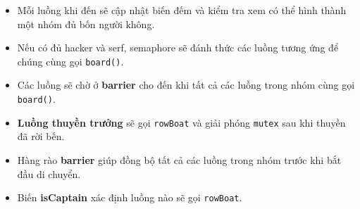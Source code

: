 \begin{itemize}
  \item Mỗi luồng khi đến sẽ cập nhật biến đếm và kiểm tra xem có thể hình thành một nhóm đủ bốn người không.
  \item Nếu có đủ hacker và serf, semaphore sẽ đánh thức các luồng tương ứng để chúng cùng gọi \texttt{board()}.
  \item Các luồng sẽ chờ ở \textbf{barrier} cho đến khi tất cả các luồng trong nhóm cùng gọi \texttt{board()}.
  \item \textbf{Luồng thuyền trưởng} sẽ gọi \texttt{rowBoat} và giải phóng \texttt{mutex} sau khi thuyền đã rời bến.
  \item Hàng rào \textbf{barrier} giúp đồng bộ tất cả các luồng trong nhóm trước khi bắt đầu di chuyển.
  \item Biến \textbf{isCaptain} xác định luồng nào sẽ gọi \texttt{rowBoat}.
\end{itemize}
\newpage







